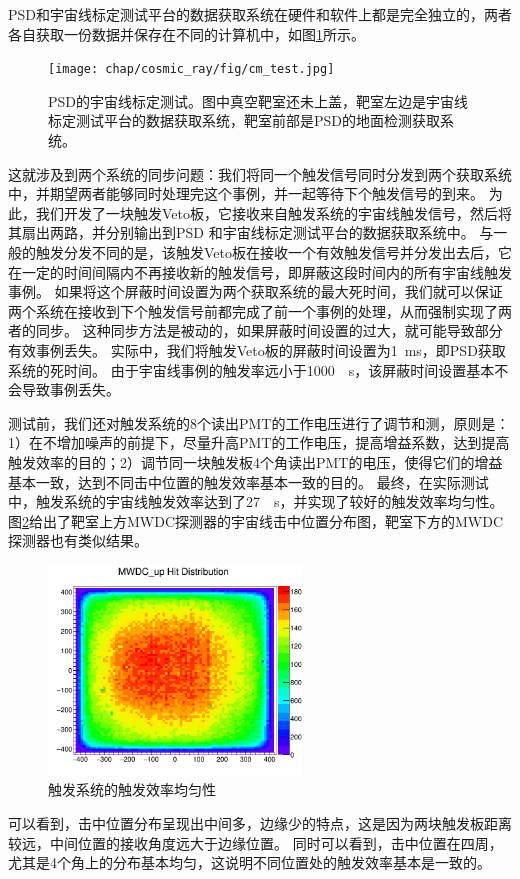 PSD和宇宙线标定测试平台的数据获取系统在硬件和软件上都是完全独立的，两者各自获取一份数据并保存在不同的计算机中，如图\ref{fig:cosmic_ray:cm_test}所示。
\label{sec:cosmic_ray:cm_test}
\begin{figure}[htbp]
	\centering
	\texttt{[image: chap/cosmic\_ray/fig/cm\_test.jpg]}
	\caption{PSD的宇宙线标定测试。图中真空靶室还未上盖，靶室左边是宇宙线标定测试平台的数据获取系统，靶室前部是PSD的地面检测获取系统。}
	\label{fig:cosmic_ray:cm_test}
\end{figure}
这就涉及到两个系统的同步问题：我们将同一个触发信号同时分发到两个获取系统中，并期望两者能够同时处理完这个事例，并一起等待下个触发信号的到来。
为此，我们开发了一块触发Veto板，它接收来自触发系统的宇宙线触发信号，然后将其扇出两路，并分别输出到PSD
和宇宙线标定测试平台的数据获取系统中。
与一般的触发分发不同的是，该触发Veto板在接收一个有效触发信号并分发出去后，它在一定的时间间隔内不再接收新的触发信号，即屏蔽这段时间内的所有宇宙线触发事例。
如果将这个屏蔽时间设置为两个获取系统的最大死时间，我们就可以保证两个系统在接收到下个触发信号前都完成了前一个事例的处理，从而强制实现了两者的同步。
这种同步方法是被动的，如果屏蔽时间设置的过大，就可能导致部分有效事例丢失。
实际中，我们将触发Veto板的屏蔽时间设置为\SI{1}{ms}，即PSD获取系统的死时间。
由于宇宙线事例的触发率远小于\SI{1000}{\per\second}，该屏蔽时间设置基本不会导致事例丢失。

测试前，我们还对触发系统的8个读出PMT的工作电压进行了调节和测，原则是：1）在不增加噪声的前提下，尽量升高PMT的工作电压，提高增益系数，达到提高触发效率的目的；2）调节同一块触发板4个角读出PMT的电压，使得它们的增益基本一致，达到不同击中位置的触发效率基本一致的目的。
最终，在实际测试中，触发系统的宇宙线触发效率达到了\SI{27}{\per\second}，并实现了较好的触发效率均匀性。
图\ref{fig:cosmic_ray:hitposition}给出了靶室上方MWDC探测器的宇宙线击中位置分布图，靶室下方的MWDC探测器也有类似结果。
\begin{figure}[htb]
\centering
\includegraphics[width=0.6\textwidth]{chap/cosmic_ray/fig/hitposition_mwdc.png}
\caption{触发系统的触发效率均匀性}
\label{fig:cosmic_ray:hitposition}
\end{figure}
可以看到，击中位置分布呈现出中间多，边缘少的特点，这是因为两块触发板距离较远，中间位置的接收角度远大于边缘位置。
同时可以看到，击中位置在四周，尤其是4个角上的分布基本均匀，这说明不同位置处的触发效率基本是一致的。

